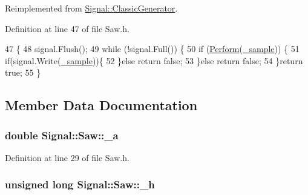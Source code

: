 Reimplemented from \hyperlink{class_signal_1_1_classic_generator_a308c13baa66020d44c2227bd58db4b4f}{Signal\+::\+Classic\+Generator}.



Definition at line 47 of file Saw.\+h.


\begin{DoxyCode}
47                                               \{
48         signal.Flush();
49         \textcolor{keywordflow}{while} (!signal.Full()) \{
50             \textcolor{keywordflow}{if} (\hyperlink{class_signal_1_1_saw_a6fb3216b94fea4daa83b27f5de194fa0}{Perform}(\hyperlink{class_signal_1_1_classic_generator_a40313d0d806d6e44af7d41b3ef3a0822}{\_sample})) \{
51                 \textcolor{keywordflow}{if}(signal.Write(\hyperlink{class_signal_1_1_classic_generator_a40313d0d806d6e44af7d41b3ef3a0822}{\_sample}))\{
52                 \}\textcolor{keywordflow}{else} \textcolor{keywordflow}{return} \textcolor{keyword}{false};
53             \}\textcolor{keywordflow}{else} \textcolor{keywordflow}{return} \textcolor{keyword}{false};
54         \}\textcolor{keywordflow}{return} \textcolor{keyword}{true};
55     \}
\end{DoxyCode}


\subsection{Member Data Documentation}
\hypertarget{class_signal_1_1_saw_a190de681addc384749845750897859e5}{
\subsubsection[{\+\_\+a}]{\setlength{\rightskip}{0pt plus 5cm}double Signal\+::\+Saw\+::\+\_\+a\hspace{0.3cm}{\ttfamily [protected]}}}\label{class_signal_1_1_saw_a190de681addc384749845750897859e5}


Definition at line 29 of file Saw.\+h.

\hypertarget{class_signal_1_1_saw_a359bfaaab07a3c830da6b81baf045330}{
\subsubsection[{\+\_\+h}]{\setlength{\rightskip}{0pt plus 5cm}unsigned long Signal\+::\+Saw\+::\+\_\+h\hspace{0.3cm}{\ttfamily [protected]}}}\label{class_signal_1_1_saw_a359bfaaab07a3c830da6b81baf045330}


